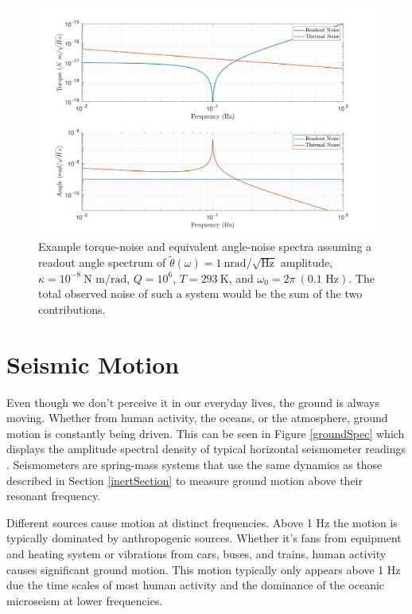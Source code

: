 \documentclass{book}
\begin{document}
\begin{figure}[!h]
\begin{centering}
\includegraphics[width=\textwidth]{NoiseSpectrum.pdf}
\caption{Example torque-noise and equivalent angle-noise spectra assuming a readout angle spectrum of $\tilde{\theta}(\omega) = 1\ \text{nrad}/\sqrt{\text{Hz}}$ amplitude, $\kappa=10^{-8}\ \text{N m/rad}$, $Q=10^6$, $T=293\ \text{K}$, and $\omega_0=2\pi\ (0.1 \text{ Hz})$. The total observed noise of such a system would be the sum of the two contributions.}\label{noiseSpec}
\end{centering}
\end{figure}

\section{Seismic Motion}

\quad Even though we don't perceive it in our everyday lives, the ground is always moving. Whether from human activity, the oceans, or the atmosphere, ground motion is constantly being driven. This can be seen in Figure \ref{groundSpec} which displays the amplitude spectral density of typical horizontal seismometer readings \cite{ross2020precision}. Seismometers are spring-mass systems that use the same dynamics as those described in Section \ref{inertSection} to measure ground motion above their resonant frequency. 

Different sources cause motion at distinct frequencies. Above 1 Hz the motion is typically dominated by anthropogenic sources. Whether it's fans from equipment and heating system or vibrations from cars, buses, and trains, human activity causes significant ground motion. This motion typically only appears above 1 Hz due the time scales of most human activity and the dominance of the oceanic microseism at lower frequencies. 
\end{document}
